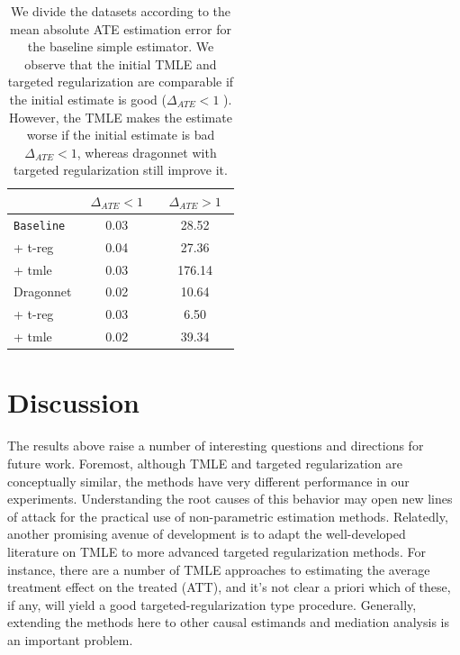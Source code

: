 \documentclass{article}
\begin{document}
\begin{table}[htb]
    \centering
    \captionsetup{width=0.8\linewidth}\label{tb:semiparam_goodinit}
    \caption{We divide the datasets according to the mean absolute ATE estimation error for the baseline simple estimator. We observe that the initial TMLE and targeted regularization are
comparable if the initial estimate is good ($\Delta_{ATE} <1$ ). However, the TMLE makes the estimate worse if the initial estimate is bad $\Delta_{ATE} <1$, whereas dragonnet with targeted regularization still improve it.}


  \vspace{1em}
  \begin{tabular}{l S[separate-uncertainty,table-figures-uncertainty=1] S[separate-uncertainty,table-figures-uncertainty=1]
} 
    &  &  \\ 

    \midrule
    \texttt{Baseline} & 0.03  & 28.52   \\
    \midrule
    + t-reg & 0.04   & 27.36 \\
    + tmle & 0.03   & 176.14 \\
    \midrule
    Dragonnet & 0.02   & 10.64 \\
    \midrule
    + t-reg & 0.03   & 6.50 \\
    + tmle & 0.02   & 39.34 \\
    \bottomrule
  \end{tabular}

  \end{table}
  \section{Discussion}
  The results above raise a number of interesting questions and directions for future work.
  Foremost, although TMLE and targeted regularization are conceptually similar, the methods have
  very different performance in our experiments. Understanding the root causes of this behavior
  may open new lines of attack for the practical use of non-parametric estimation methods.
  Relatedly, another promising avenue of development is to adapt the well-developed literature on
  TMLE \citep[e.g.,][]{vanderLaan:Rose:2011,vanderLaan:Gruber:2016} to more advanced targeted regularization methods.
  For instance, there are a number of TMLE approaches to estimating the average treatment effect on the treated (ATT),
  and it's not clear a priori which of these, if any, will yield a good targeted-regularization type procedure.
  Generally, extending the methods here to other causal estimands and mediation analysis is an important problem.
\end{document}
